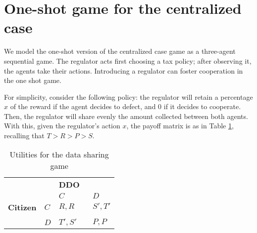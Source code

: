 \section{One-shot game for the centralized case}\label{one-shot}

    


We model the one-shot version of the centralized case game as a
three-agent sequential game.
The regulator acts first choosing a tax policy; 
after observing it, the agents take their actions. 
Introducing a regulator can foster cooperation in the one shot game.

For simplicity, consider the following policy: the regulator will retain a percentage $x$ of the reward if the agent decides to defect, and 0 if it decides to cooperate. Then, the regulator will share evenly the amount collected between 
both agents. With this, given the regulator's action $x$, the payoff matrix 
is as in Table \ref{tab:payoffIPD2}, recalling that  $T > R > P >S$.
    
    \begin{table}[h!]
    \begin{center}
    \begin{tabular}{cl|lll}
    \multicolumn{1}{l}{}                                   &     & \multicolumn{3}{l}{\textbf{DDO}} \\ \cline{3-5} 
    \multicolumn{1}{l}{}                                   &     & $C$         &       & $D$        \\ \hline
    \multicolumn{1}{c|}{\textbf{Citizen}} & $C$ & $R,R$       &       & $S',T'$      \\
    \multicolumn{1}{c|}{}                                  &     &             &       &            \\
    \multicolumn{1}{c|}{}                                  & $D$ & $T',S'$       &       & $P,P$     
    \end{tabular} 
    \end{center}
    \caption{Utilities for the data sharing game}
    \label{tab:payoffIPD2}
    \vspace{-2ex}
    \end{table}
    
